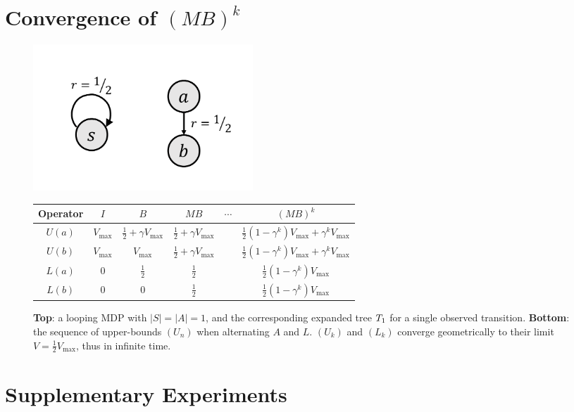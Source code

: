\documentclass[runningheads]{llncs}
\begin{document}
\section{Convergence of $(M B)^k$}
\label{sec:convergence}
\begin{figure}[H]
    \centering
    \includegraphics[trim=2.5cm 1cm 1.5cm 2cm, clip, width=0.4\textwidth]{img/loop.pdf}\\
    \begin{tabular}{cccccc}
         \toprule
         Operator & $I$ & $B$ & $M B$ & $\cdots$ & $(M B)^k$ \\
         \midrule
         $U(a)$ & $V_{\max}$ & $\frac{1}{2} + \gamma V_{\max}$ & $\frac{1}{2} + \gamma V_{\max}$ && $\frac{1}{2}(1-\gamma^k)V_{\max} + \gamma^k V_{\max}$\\
         $U(b)$ & $V_{\max}$ & $V_{\max}$ & $\frac{1}{2} + \gamma V_{\max}$ && $\frac{1}{2}(1-\gamma^k)V_{\max} + \gamma^k V_{\max}$\\
         $L(a)$ & $0$ & $\frac{1}{2}$ & $\frac{1}{2}$ && $\frac{1}{2}(1-\gamma^k)V_{\max}$\\
		 $L(b)$ & $0$ & $0$ & $\frac{1}{2}$ && $\frac{1}{2}(1-\gamma^k)V_{\max}$\\
         \bottomrule
    \end{tabular}
    \caption{\textbf{Top}: a looping MDP with $|S|=|A|=1$, and the corresponding expanded tree $T_1$ for a single observed transition. \textbf{Bottom}: the sequence of upper-bounds $(U_n)$ when alternating $A$ and $L$. $(U_k)$ and $(L_k)$ converge geometrically to their limit $V = \frac{1}{2}V_{\max}$, thus in infinite time.} %
    \label{fig:simple_loop}
\end{figure}

\section{Supplementary Experiments}
\end{document}
